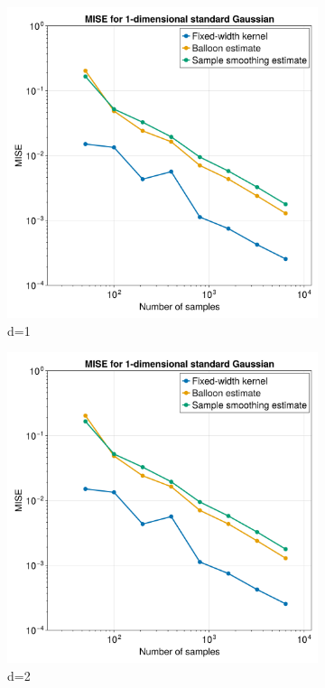 \documentclass{article}
\begin{document}
\begin{figure}
\begin{subfigure}{.5\textwidth}
  \centering
  \includegraphics[width=.8\linewidth]{images/MISE_d=1.png}
  \caption{d=1}
  \label{fig:sfig1}
\end{subfigure}%
\begin{subfigure}{.5\textwidth}
  \centering
  \includegraphics[width=.8\linewidth]{images/MISE_d=1.png}
  \caption{d=2}
  \label{fig:sfig2}
\end{subfigure}
\begin{subfigure}{.5\textwidth}
  \centering

\end{subfigure}
\end{figure}
\end{document}
